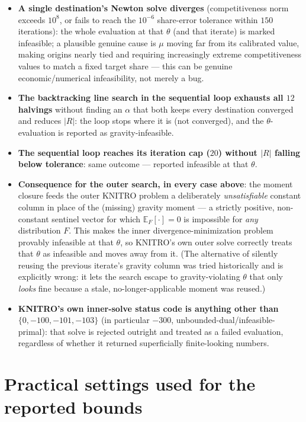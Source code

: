 \documentclass[11pt]{article}
\newcommand{\E}{\mathbb{E}}
\begin{document}
\begin{itemize}
  \item \textbf{A single destination's Newton solve diverges} (competitiveness norm exceeds
  $10^8$, or fails to reach the $10^{-6}$ share-error tolerance within $150$ iterations): the whole
  evaluation at that $\theta$ (and that iterate) is marked infeasible; a plausible genuine cause is
  $\mu$ moving far from its calibrated value, making origins nearly tied and requiring increasingly
  extreme competitiveness values to match a fixed target share — this can be genuine economic/numerical
  infeasibility, not merely a bug.
  \item \textbf{The backtracking line search in the sequential loop exhausts all $12$ halvings}
  without finding an $\alpha$ that both keeps every destination converged and reduces $|R|$: the
  loop stops where it is (not converged), and the $\theta$-evaluation is reported as gravity-infeasible.
  \item \textbf{The sequential loop reaches its iteration cap ($20$) without $|R|$ falling below
  tolerance}: same outcome — reported infeasible at that $\theta$.
  \item \textbf{Consequence for the outer search, in every case above}: the moment closure feeds the
  outer KNITRO problem a deliberately \emph{unsatisfiable} constant column in place of the (missing)
  gravity moment — a strictly positive, non-constant sentinel vector for which $\E_F[\cdot]=0$ is
  impossible for \emph{any} distribution $F$. This makes the inner divergence-minimization problem
  provably infeasible at that $\theta$, so KNITRO's own outer solve correctly treats that $\theta$ as
  infeasible and moves away from it. (The alternative of silently reusing the previous iterate's
  gravity column was tried historically and is explicitly wrong: it lets the search escape to
  gravity-violating $\theta$ that only \emph{looks} fine because a stale, no-longer-applicable moment
  was reused.)
  \item \textbf{KNITRO's own inner-solve status code is anything other than
  $\{0,-100,-101,-103\}$} (in particular $-300$, unbounded-dual/infeasible-primal): that solve is
  rejected outright and treated as a failed evaluation, regardless of whether it returned
  superficially finite-looking numbers.
\end{itemize}

\section{Practical settings used for the reported bounds}
\label{sec:settings}
\end{document}
